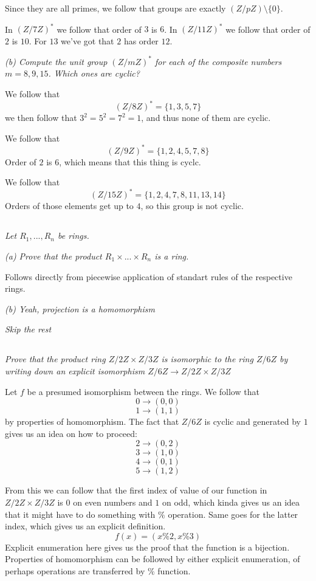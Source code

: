 \documentclass[11pt,oneside,titlepage]{book}
\newcommand{\set}[1]{\{ #1 \}}
\begin{document}
Since they are all primes, we follow that groups are exactly $(Z/pZ)
\setminus \set{0}$.

In $(Z/7Z)^*$ we follow that order of $3$ is $6$. In $(Z/11Z)^*$ we
follow that order of $2$ is $10$. For $13$ we've got that $2$ has
order $12$.

\textit{(b) Compute the unit group $(Z/mZ)^*$ for each of the
composite numbers $m = 8, 9, 15$. Which ones are cyclic?}

We follow that
$$(Z/8Z)^* = \set{1, 3, 5, 7}$$
we then follow that $3^2 = 5^2 = 7^2 = 1$, and thus none of them are
cyclic.

We follow that
$$(Z/9Z)^* = \set{1, 2, 4, 5, 7, 8}$$
Order of $2$ is $6$, which means that this thing is cyclc.


We follow that
$$(Z/15Z)^* = \set{1, 2, 4, 7, 8, 11, 13, 14}$$
Orders of those elements get up to $4$, so this group is not cyclic.

\subsection{}

\textit{Let $R_1, ..., R_n$ be rings.}

\textit{(a) Prove that the product $R_1 \times ... \times R_n$ is a
ring.}

Follows directly from piecewise application of standart rules of the
respective rings.

\textit{(b) Yeah, projection is a homomorphism}

\textit{Skip the rest}

\subsection{}

\textit{Prove that the product ring $Z/2Z \times Z/3Z$ is isomorphic
to the ring $Z/6Z$ by writing down an explicit isomorphism $Z/6Z \to
Z/2Z \times Z/3Z$}

Let $f$ be a presumed isomorphism between the rings.  We follow that
$$0 \to (0, 0)$$
$$1 \to (1, 1)$$
by properties of homomorphism.  The fact that $Z/6Z$ is cyclic and
generated by $1$ gives us an idea on how to proceed:
$$2 \to (0, 2)$$
$$3 \to (1, 0)$$
$$4 \to (0, 1)$$
$$5 \to (1, 2)$$

From this we can follow that the first index of value of our function
in $Z/2Z \times Z/3Z$ is $0$ on even numbers and $1$ on odd, which
kinda gives us an idea that it might have to do something with $\%$
operation. Same goes for the latter index, which gives us an explicit
definition.
$$f(x) = (x \% 2, x \% 3)$$
Explicit enumeration here gives us the proof that the function is a
bijection. Properties of homomorphism can be followed by either
explicit enumeration, of perhaps operations are transferred by $\%$
function.
\end{document}
